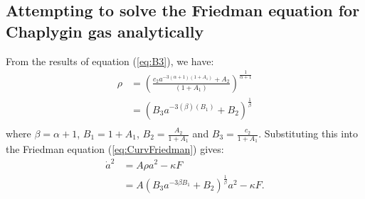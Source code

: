 \documentclass[a4paper, 11pt]{FSKH_623_Report}
\numberwithin{equation}{section}
\newcommand{\brac}[1]{\left(#1\right)}
\begin{document}
\subsection*{Attempting to solve the Friedman equation for Chaplygin gas analytically}
From the results of equation (\ref{eq:B3}), we have:
\begin{equation}\label{eq:B5}
\begin{split}
\rho&=\brac{\frac{c_{2}a^{-3\brac{\alpha+1}\brac{1+A_{1}}}+A_{2}}{\brac{1+A_{1}}}}^{\frac{1}{\alpha+1}}\\
&=\brac{B_{3}a^{-3\brac{\beta}\brac{B_{1}}}+B_{2}}^{\frac{1}{\beta}}\\
\end{split}
\end{equation}
where $\beta=\alpha+1$, $B_{1}=1+A_{1}$, $B_{2}=\frac{A_{2}}{1+A_{1}}$ and $B_{3}=\frac{c_{2}}{1+A_{1}}$. Substituting this into the Friedman equation (\ref{eq:CurvFriedman}) gives:
\begin{equation}\label{eq:B6}
\begin{split}
\dot{a}^{2} &= A\rho a^{2}-\kappa F\\
&= A\brac{B_{3}a^{-3\beta B_{1}}+B_{2}}^{\frac{1}{\beta}} a^{2}-\kappa F.\\
\end{split}
\end{equation}
\end{document}
